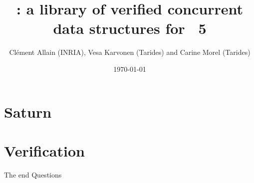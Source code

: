 \documentclass[xcolor=x11names]{beamer}
\title{\Saturn: a library of verified concurrent data structures for \OCaml~5}
\date{\today}
\author{
  Clément Allain (INRIA),
  Vesa Karvonen (Tarides) and
  Carine Morel (Tarides)
}
\begin{document}
\maketitle


\section{Saturn}



\section{Verification}


\begin{frame}{The end}
\Large
\centering
Questions
\end{frame}
\end{document}
